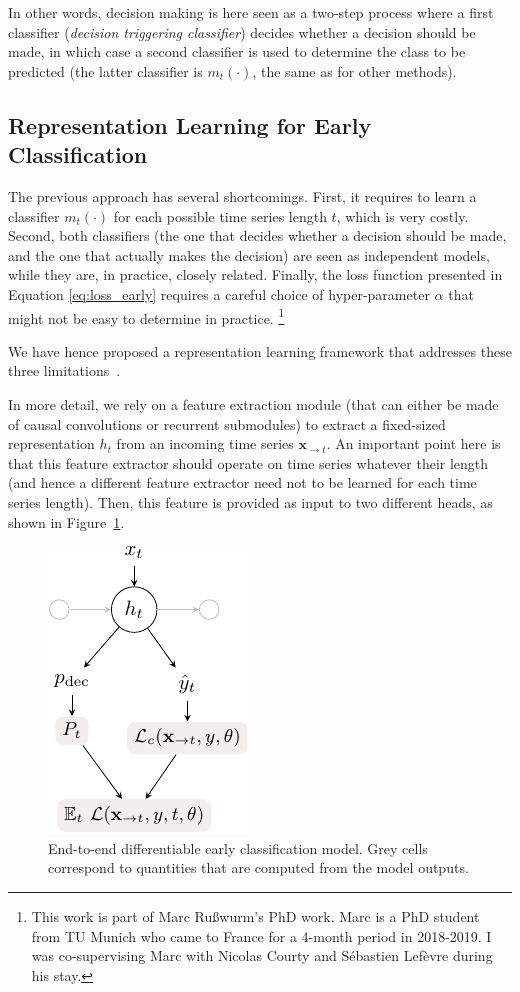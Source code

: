 In other words, decision making is here seen as a two-step process where a
first classifier (\emph{decision triggering classifier}) decides whether a decision
should be made, in which case a
second classifier is used to determine the class to be predicted (the latter
classifier is $m_t(\cdot)$, the same as for other methods).

\subsection{Representation Learning for Early Classification}

The previous approach has several shortcomings.
First, it requires to learn a classifier $m_t(\cdot)$ for each possible time
series length $t$, which is very costly.
Second, both classifiers (the one that decides whether a decision should be
made, and the one that actually makes the decision) are seen as independent
models, while they are, in practice, closely related.
Finally, the loss function presented in Equation \eqref{eq:loss_early} requires
a careful choice of hyper-parameter $\alpha$ that might not be easy to
determine in
practice.%
\footnote{This work is part of Marc Rußwurm's PhD work.
Marc is a PhD student from TU Munich who came to France for a
4-month period in 2018-2019. I was co-supervising Marc with Nicolas Courty
and Sébastien Lefèvre during his stay.}

We have hence proposed a representation learning framework that
addresses these three limitations~\cite{ruwurm:hal-02174314}.

In more detail, we rely on a feature extraction module (that can either be
made of causal convolutions or recurrent submodules) to extract a fixed-sized
representation $h_t$ from an incoming time series $\mathbf{x}_{\rightarrow t}$.
An important point here is that this feature extractor should operate on time
series whatever their length (and hence a different feature extractor need not
to be learned for each time series length).
Then, this feature is provided as input to two different heads, as shown in
Figure~\ref{fig:early}.

\begin{figure}[t]
\centering
\includegraphics[width=.3\textwidth]{fig/early_module_cropped}
\caption{End-to-end differentiable early classification model.
Grey cells correspond to quantities that are
computed from the model outputs. \label{fig:early}}
\end{figure}

